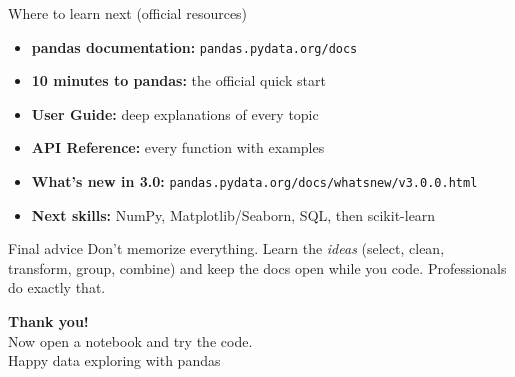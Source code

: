 \documentclass[aspectratio=169,10pt]{beamer}
\begin{document}
\begin{frame}{Where to learn next (official resources)}
  \begin{itemize}
    \item \textbf{pandas documentation:} \texttt{pandas.pydata.org/docs}
    \item \textbf{10 minutes to pandas:} the official quick start
    \item \textbf{User Guide:} deep explanations of every topic
    \item \textbf{API Reference:} every function with examples
    \item \textbf{What's new in 3.0:} \texttt{pandas.pydata.org/docs/whatsnew/v3.0.0.html}
    \item \textbf{Next skills:} NumPy, Matplotlib/Seaborn, SQL, then scikit-learn
  \end{itemize}
  \vspace{3mm}
  \begin{block}{Final advice}
    Don't memorize everything. Learn the \emph{ideas} (select, clean, transform, group,
    combine) and keep the docs open while you code. Professionals do exactly that.
  \end{block}
\end{frame}

\begin{frame}[plain]
  \centering
  \vfill
  {\color{navy}\Huge\bfseries Thank you!}\\[4mm]
  {\color{coral}\Large Now open a notebook and try the code.}\\[6mm]
  {\color{ink}\large Happy data exploring with pandas}
  \vfill
\end{frame}
\end{document}
